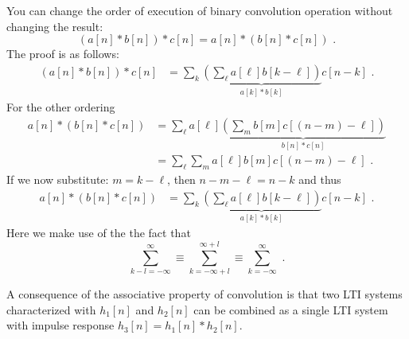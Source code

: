 You can change the order of execution of binary convolution operation without changing the result:
\begin{equation}
(a[n]*b[n])*c[n] = a[n]*(b[n]*c[n])\,\,.
\end{equation}
The proof is as follows:
\begin{align}
(a[n]*b[n])*c[n] &= \sum_{k}\underbrace{\left(\sum_\ell a[\ell]b[k-\ell]\right)}_{a[k]*b[k]} c[n-k]\,\,.
\end{align}
For the other ordering
\begin{align}
a[n]*(b[n]*c[n]) &= \sum_{\ell} a[\ell] \underbrace{\left(\sum_m b[m]c[(n-m)-\ell]\right)}_{b[n]*c[n]}\\
                 &= \sum_{\ell} \sum_m a[\ell] b[m]c[(n-m)-\ell]\,\,.
\end{align}
If we now substitute: $m=k-\ell$, then $n-m-\ell=n-k$ and thus
\begin{align}
a[n]*(b[n]*c[n]) &= \sum_{k} \underbrace{\left(\sum_{\ell} a[\ell] b[k-\ell]\right)}_{a[k]*b[k]} c[n-k]\,\,.
\end{align}
Here we make use of the the fact that 
\begin{equation}
\sum_{k-l=-\infty}^{\infty} \equiv \sum_{k=-\infty+l}^{\infty+l} \equiv \sum_{k=-\infty}^{\infty}\,\,. 
\end{equation}


\begin{marginfigure}

\begin{center}
\end{center}
\caption{A consequence of the associative property of convolution is
  that two LTI systems characterized with $h_1[n]$ and $h_2[n]$ can be
  combined as a single LTI system with impulse response
  $h_3[n]=h_1[n]*h_2[n]$.}
\label{fig:cascade_lti}
\end{marginfigure}



